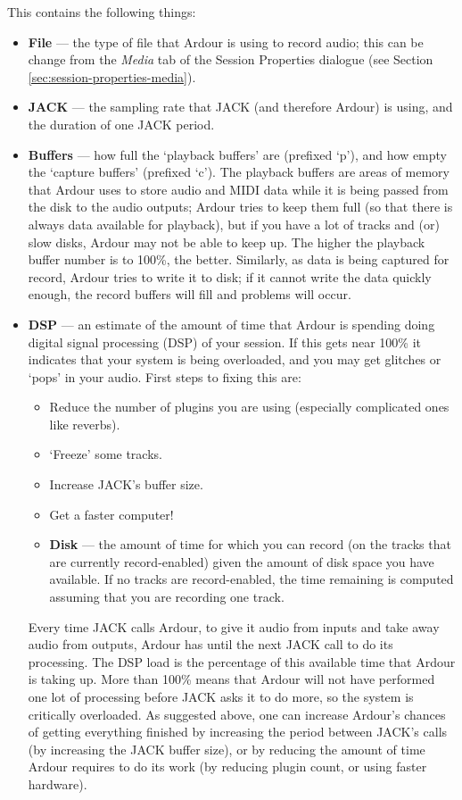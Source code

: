 \documentclass[10pt,a4paper]{book}
\begin{document}
This contains the following things:
\begin{itemize}
\item \textbf{File} --- the type of file that Ardour is using to record audio;
  this can be change from the \emph{Media} tab of the Session
  Properties dialogue (see Section
  \ref{sec:session-properties-media}).
\item \textbf{JACK} --- the sampling rate that JACK (and therefore Ardour) is
  using, and the duration of one JACK period.
\item \textbf{Buffers} --- how full the `playback buffers' are (prefixed `p'),
  and how empty the `capture buffers' (prefixed `c').  The playback
  buffers are areas of memory that Ardour uses to store audio and MIDI
  data while it is being passed from the disk to the audio outputs;
  Ardour tries to keep them full (so that there is always data
  available for playback), but if you have a lot of tracks and (or)
  slow disks, Ardour may not be able to keep up.  The higher the
  playback buffer number is to 100\%, the better.  Similarly, as data
  is being captured for record, Ardour tries to write it to disk; if
  it cannot write the data quickly enough, the record buffers will
  fill and problems will occur.
\item \textbf{DSP} --- an estimate of the amount of time that Ardour is
  spending doing digital signal processing (DSP) of your session.  If
  this gets near 100\% it indicates that your system is being
  overloaded, and you may get glitches or `pops' in your audio.  First
  steps to fixing this are:
\begin{itemize}
\item Reduce the number of plugins you are using (especially
  complicated ones like reverbs).
\item `Freeze' some tracks.
\item Increase JACK's buffer size.
\item Get a faster computer!
\item \textbf{Disk} --- the amount of time for which you can record (on the
  tracks that are currently record-enabled) given the amount of disk
  space you have available.  If no tracks are record-enabled, the time
  remaining is computed assuming that you are recording one track.
\end{itemize}

\begin{danger}
Every time JACK calls Ardour, to give it audio from inputs and take
away audio from outputs, Ardour has until the next JACK call to do its
processing.  The DSP load is the percentage of this available time
that Ardour is taking up.  More than 100\% means that Ardour will not
have performed one lot of processing before JACK asks it to do more,
so the system is critically overloaded.  As suggested above, one can
increase Ardour's chances of getting everything finished by increasing
the period between JACK's calls (by increasing the JACK buffer size),
or by reducing the amount of time Ardour requires to do its work (by
reducing plugin count, or using faster hardware).
\end{danger}


\end{itemize}
\end{document}
